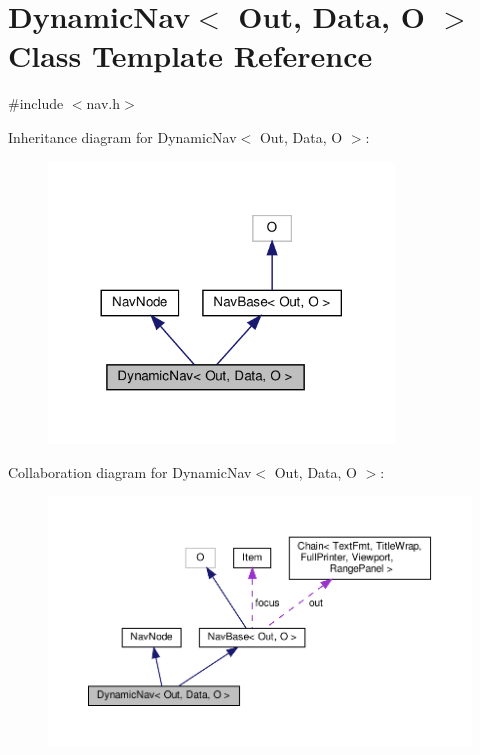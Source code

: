 \hypertarget{classDynamicNav}{}\section{Dynamic\+Nav$<$ Out, Data, O $>$ Class Template Reference}
\label{classDynamicNav}


{\ttfamily \#include $<$nav.\+h$>$}



Inheritance diagram for Dynamic\+Nav$<$ Out, Data, O $>$\+:\nopagebreak
\begin{figure}[H]
\begin{center}
\leavevmode
\includegraphics[width=260pt]{classDynamicNav__inherit__graph}
\end{center}
\end{figure}


Collaboration diagram for Dynamic\+Nav$<$ Out, Data, O $>$\+:\nopagebreak
\begin{figure}[H]
\begin{center}
\leavevmode
\includegraphics[width=350pt]{classDynamicNav__coll__graph}
\end{center}
\end{figure}
